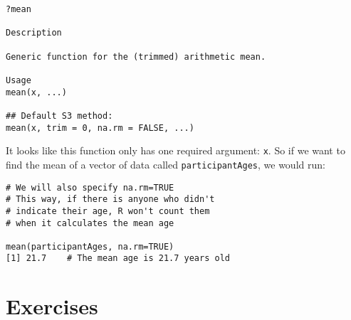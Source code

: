 \begin{framed}
\begin{Verbatim}[samepage=TRUE]
?mean

Description

Generic function for the (trimmed) arithmetic mean.

Usage
mean(x, ...)

## Default S3 method:
mean(x, trim = 0, na.rm = FALSE, ...)
\end{Verbatim}
\end{framed}

It looks like this function only has one required argument: \verb|x|. So if we want to find the mean of a vector of data called \verb|participantAges|, we would run:

\begin{framed}
\begin{Verbatim}[samepage=TRUE]
# We will also specify na.rm=TRUE
# This way, if there is anyone who didn't
# indicate their age, R won't count them
# when it calculates the mean age

mean(participantAges, na.rm=TRUE)
[1] 21.7    # The mean age is 21.7 years old
\end{Verbatim}
\end{framed}

\section{Exercises}

